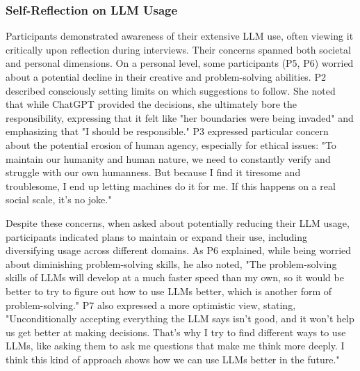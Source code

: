 \subsubsection{Self-Reflection on LLM Usage}
Participants demonstrated awareness of their extensive LLM use, often viewing it critically upon reflection during interviews. Their concerns spanned both societal and personal dimensions. On a personal level, some participants (P5, P6) worried about a potential decline in their creative and problem-solving abilities. P2 described consciously setting limits on which suggestions to follow. She noted that while ChatGPT provided the decisions, she ultimately bore the responsibility, expressing that it felt like "her boundaries were being invaded" and emphasizing that "I should be responsible." P3 expressed particular concern about the potential erosion of human agency, especially for ethical issues: "To maintain our humanity and human nature, we need to constantly verify and struggle with our own humanness. But because I find it tiresome and troublesome, I end up letting machines do it for me. If this happens on a real social scale, it's no joke." 

Despite these concerns, when asked about potentially reducing their LLM usage, participants indicated plans to maintain or expand their use, including diversifying usage across different domains. As P6 explained, while being worried about diminishing problem-solving skills, he also noted, "The problem-solving skills of LLMs will develop at a much faster speed than my own, so it would be better to try to figure out how to use LLMs better, which is another form of problem-solving." P7 also expressed a more optimistic view, stating, "Unconditionally accepting everything the LLM says isn't good, and it won't help us get better at making decisions. That's why I try to find different ways to use LLMs, like asking them to ask me questions that make me think more deeply. I think this kind of approach shows how we can use LLMs better in the future."